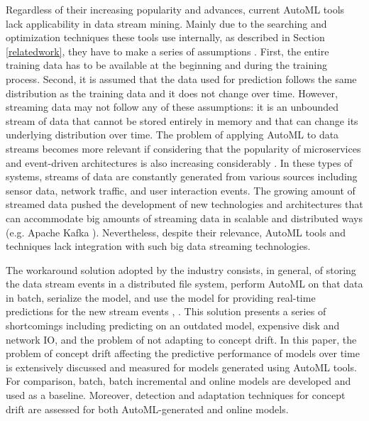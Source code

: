 \documentclass{sig-alternate-br}
\begin{document}
Regardless of their increasing popularity and advances, current AutoML tools lack applicability in data stream mining. Mainly due to the searching and optimization techniques these tools use internally, as described in Section \ref{relatedwork}, they have to make a series of assumptions \cite{madrid2019towards}. First, the entire training data has to be available at the beginning and during the training process. Second, it is assumed that the data used for prediction follows the same distribution as the training data and it does not change over time. However, streaming data may not follow any of these assumptions: it is an unbounded stream of data that cannot be stored entirely in memory and that can change its underlying distribution over time. The problem of applying AutoML to data streams becomes more relevant if considering that the popularity of microservices and event-driven architectures is also increasing considerably \cite{richards2015microservices}. In these types of systems, streams of data are constantly generated from various sources including sensor data, network traffic, and user interaction events. The growing amount of streamed data pushed the development of new technologies and architectures that can accommodate big amounts of streaming data in scalable and distributed ways (e.g. Apache Kafka \cite{kreps2011kafka}). Nevertheless, despite their relevance, AutoML tools and techniques lack integration with such big data streaming technologies.

The workaround solution adopted by the industry consists, in general, of storing the data stream events in a distributed file system, perform AutoML on that data in batch, serialize the model, and use the model for providing real-time predictions for the new stream events \cite{uber2017michelangelo}, \cite{gctables}. This solution presents a series of shortcomings including predicting on an outdated model, expensive disk and network IO, and the problem of not adapting to concept drift. In this paper, the problem of concept drift affecting the predictive performance of models over time is extensively discussed and measured for models generated using AutoML tools. For comparison, batch, batch incremental and online models are developed and used as a baseline. Moreover, detection and adaptation techniques for concept drift are assessed for both AutoML-generated and online models. 
\end{document}
